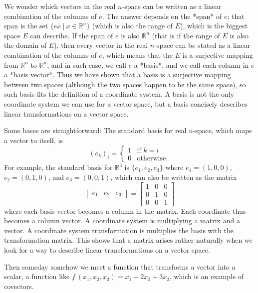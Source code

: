 We wonder which vectors in the real $n$-space
can be written as a linear combination of the columns of $e$.
The answer depends on the *span* of $e$;
that span is the set $\{ ex ~|~ x \in \mathbb{R}^n \}$
(which is also the range of $E$),
which is the biggest space $E$ can describe.
If the span of $e$ is also $\mathbb{R}^n$
(that is if the range of $E$ is also the domain of $E$),
then every vector
in the real $n$-space can be stated as a linear combination of the columns of $e$,
which means that the $E$ is a surjective mapping from $\mathbb{R}^n$ to $\mathbb{R}^n$,
and in such case, we call $e$ a *basis*,
and we call each column in $e$ a *basis vector*.
Thus we have shown that a basis is a surjective mapping between two spaces
(although the two spaces happen to be the same space),
so such basis fits the definition of a coordinate system.
A basis is not the only coordinate system we can use for a vector space,
but a basis concisely describes linear transformations on a vector space.

Some bases are straightforward:
The standard basis for real $n$-space,
which maps a vector to itself, is
\[
(e_k)_i =
\begin{cases}
1 & \text{if }k = i
\\ 0 & \text{otherwise.}
\end{cases}
\]
For example, the standard basis for $\mathbb{R}^3$
is $\{e_1,e_2,e_3\}$
where $e_1 = (1,0,0)$, $e_2 = (0,1,0)$, and $e_3 = (0,0,1)$,
which can also be written as the matrix
\[
\begin{bmatrix}e_1&e_2&e_3\end{bmatrix}
= \begin{bmatrix}1&0&0\\0&1&0\\0&0&1\end{bmatrix}
\]
where each basis vector becomes a column in the matrix.
Each coordinate thus becomes a column vector.
A coordinate system is multiplying a matrix and a vector.
A coordinate system transformation is multiplies the basis with the transformation matrix.
This shows that a matrix arises rather naturally
when we look for a way to describe linear transformations on a vector space.

Then someday somehow we meet a function that transforms a vector into a scalar,
a function like $f~(x_1,x_2,x_3) = x_1 + 2 x_2 + 3 x_3$,
which is an example of covectors.

